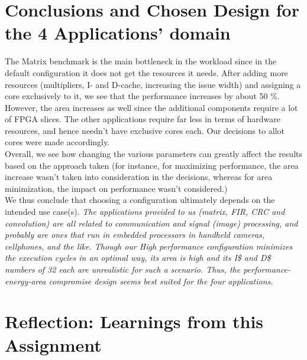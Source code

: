\documentclass[conference]{IEEEtran}
\begin{document}
\section{Conclusions and Chosen Design for the 4 Applications' domain}

The Matrix benchmark is the main bottleneck in the workload since in the default configuration it does not get the resources it needs. After adding more resources (multipliers, I- and D-cache, increasing the issue width) and assigning a core exclusively to it, we see that the performance increases by about 50 \%. However, the area increases as well since the additional components require a lot of FPGA slices.
The other applications require far less in terms of hardware resources, and hence needn't have exclusive cores each. Our decisions to allot cores were made accordingly.\\
Overall, we see how changing the various parameters can greatly affect the results based on the approach taken (for instance, for maximizing performance, the area increase wasn't taken into consideration in the decisions, whereas for area minimization, the impact on performance wasn't considered.)\\
We thus conclude that choosing a configuration ultimately depends on the intended use case(s).\textit{ The applications provided to us (matrix, FIR, CRC and convolution) are all related to communication and signal (image) processing, and probably are ones that run in embedded processors in handheld cameras, cellphones, and the like. Though our High performance configuration minimizes the execution cycles in an optimal way, its area is high and its I\$ and D\$ numbers of 32 each are unrealistic for such a scenario. Thus, the performance-energy-area compromise design seems best suited for the four applications.}

\label{sec:latex}
\section{Reflection: Learnings from this Assignment}
\end{document}
